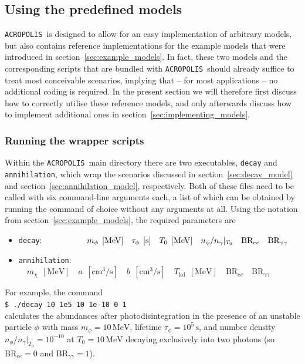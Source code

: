 \documentclass[11pt,a4paper]{article}
\newcommand{\cmd}[1]{\vspace{0.3cm}\texttt{\$ #1}\\[0.3cm]}
\newcommand{\acropolis}{\texttt{ACROPOLIS}~}
\begin{document}
\subsection{Using the predefined models}
\acropolis is designed to allow for an easy implementation of arbitrary models, but also contains reference implementations for the example models that were introduced in section~\ref{sec:example_models}. In fact, these two models and the corresponding scripts that are bundled with \acropolis should already suffice to treat most conceivable scenarios, implying that -- for most applications -- no additional coding is required. In the present section we will therefore first discuss how to correctly utilise these reference models, and only afterwards discuss how to implement additional ones in section~\ref{sec:implementing_models}.

\subsubsection{Running the wrapper scripts}
Within the \acropolis main directory there are two executables, \texttt{decay} and \texttt{annihilation}, which wrap the scenarios discussed in section~\ref{sec:decay_model} and section~\ref{sec:annihilation_model}, respectively. Both of these files need to be called with six command-line arguments each, a list of which can be obtained by running the command of choice without any arguments at all. Using the notation from section~\ref{sec:example_models}, the required parameters are
\begin{itemize}
	\item \texttt{decay}: $\hspace{1.8cm} m_\phi\;\,[\mathrm{MeV}] \quad \tau_\phi\;\,[\mathrm{s}] \quad T_0\;\,[\mathrm{MeV}] \quad n_\phi/n_\gamma|_{T_0} \quad \text{BR}_{ee} \quad \text{BR}_{\gamma\gamma}$
	\item \texttt{annihilation}: $\quad m_\chi\;\,[\mathrm{MeV}] \quad a\;\,[\mathrm{cm^3/s}] \quad b\;\,[\mathrm{cm^3/s}] \quad T_\text{kd}\;\,[\mathrm{MeV}] \quad \text{BR}_{ee} \quad \text{BR}_{\gamma\gamma}$
\end{itemize}
For example, the command\\[4mm]
\cmd{./decay 10 1e5 10 1e-10 0 1}
calculates the abundances after photodisintegration in the presence of an unstable particle $\phi$ with mass $m_\phi=10\,\mathrm{MeV}$, lifetime $\tau_\phi=10^5\,\mathrm{s}$, and number density $ n_\phi/n_\gamma|_{T_0} = 10^{-10}$ at $T_0=10\,\mathrm{MeV}$ decaying exclusively into two photons (so $\text{BR}_{ee} = 0$ and $\text{BR}_{\gamma\gamma}=1$).
\end{document}
